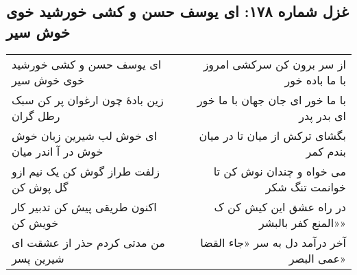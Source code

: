 \begin{center}
\section*{غزل شماره ۱۷۸: ای یوسف حسن و کشی خورشید خوی خوش سیر}
\label{sec:178}
\begin{longtable}{l p{0.5cm} r}
ای یوسف حسن و کشی خورشید خوی خوش سیر
&&
از سر برون کن سرکشی امروز با ما باده خور
\\
زین بادهٔ چون ارغوان پر کن سبک رطل گران
&&
با ما خور ای جان جهان با ما خور ای بدر پدر
\\
ای خوش لب شیرین زبان خوش خوش در آ اندر میان
&&
بگشای ترکش از میان تا در میان بندم کمر
\\
زلفت طراز گوش کن یک نیم ازو گل پوش کن
&&
می خواه و چندان نوش کن تا خوانمت تنگ شکر
\\
اکنون طریقی پیش کن تدبیر کار خویش کن
&&
در راه عشق این کیش کن ک «المنع کفر بالبشر»
\\
من مدتی کردم حذر از عشقت ای شیرین پسر
&&
آخر درآمد دل به سر «جاء القضا عمی البصر»
\\
\end{longtable}
\end{center}
